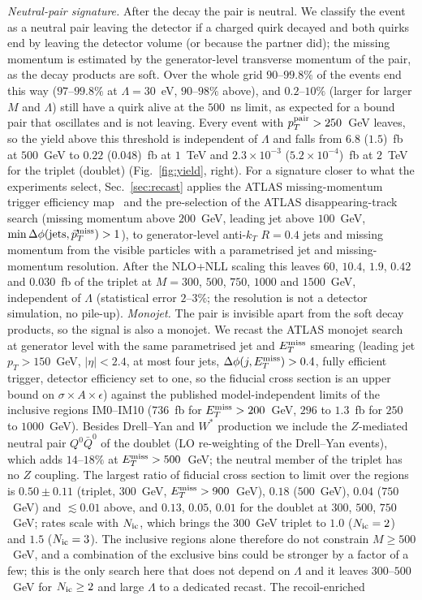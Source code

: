 \documentclass[prd,twocolumn,nofootinbib,superscriptaddress,amsmath,amssymb]{revtex4-2}
\begin{document}
\emph{Neutral-pair signature.} After the decay the pair is neutral. We classify the event as a neutral pair leaving the detector if a charged quirk decayed and both quirks end by leaving the detector volume (or because the partner did); the missing momentum is estimated by the generator-level transverse momentum of the pair, as the decay products are soft. Over the whole grid $90$--$99.8\%$ of the events end this way ($97$--$99.8\%$ at $\Lambda=30$~eV, $90$--$98\%$ above), and $0.2$--$10\%$ (larger for larger $M$ and $\Lambda$) still have a quirk alive at the $500$~ns limit, as expected for a bound pair that oscillates and is not leaving. Every event with $p_T^{\rm pair}>250$~GeV leaves, so the yield above this threshold is independent of $\Lambda$ and falls from $6.8$ ($1.5$)~fb at $500$~GeV to $0.22$ ($0.048$)~fb at $1$~TeV and $2.3\times10^{-3}$ ($5.2\times10^{-4}$)~fb at $2$~TeV for the triplet (doublet) (Fig.~\ref{fig:yield}, right). For a signature closer to what the experiments select, Sec.~\ref{sec:recast} applies the ATLAS missing-momentum trigger efficiency map~\cite{ATLAS:DT,RecastingCodes} and the pre-selection of the ATLAS disappearing-track search (missing momentum above $200$~GeV, leading jet above $100$~GeV, $\min\Delta\phi(\text{jets},\vec p_T^{\rm miss})>1$), to generator-level anti-$k_T$ $R=0.4$ jets and missing momentum from the visible particles with a parametrised jet and missing-momentum resolution. After the NLO+NLL scaling this leaves $60$, $10.4$, $1.9$, $0.42$ and $0.030$~fb of the triplet at $M=300$, $500$, $750$, $1000$ and $1500$~GeV, independent of $\Lambda$ (statistical error $2$--$3\%$; the resolution is not a detector simulation, no pile-up). \emph{Monojet.} The pair is invisible apart from the soft decay products, so the signal is also a monojet. We recast the ATLAS monojet search~\cite{ATLAS:monojet} at generator level with the same parametrised jet and $E_T^{\rm miss}$ smearing (leading jet $p_T>150$~GeV, $|\eta|<2.4$, at most four jets, $\Delta\phi(j,E_T^{\rm miss})>0.4$, fully efficient trigger, detector efficiency set to one, so the fiducial cross section is an upper bound on $\sigma\times A\times\epsilon$) against the published model-independent limits of the inclusive regions IM0--IM10 ($736$~fb for $E_T^{\rm miss}>200$~GeV, $296$ to $1.3$~fb for $250$ to $1000$~GeV). Besides Drell--Yan and $W^*$ production we include the $Z$-mediated neutral pair $Q^0\bar Q^0$ of the doublet (LO re-weighting of the Drell--Yan events), which adds $14$--$18\%$ at $E_T^{\rm miss}>500$~GeV; the neutral member of the triplet has no $Z$ coupling. The largest ratio of fiducial cross section to limit over the regions is $0.50\pm0.11$ (triplet, $300$~GeV, $E_T^{\rm miss}>900$~GeV), $0.18$ ($500$~GeV), $0.04$ ($750$~GeV) and $\lesssim0.01$ above, and $0.13$, $0.05$, $0.01$ for the doublet at $300$, $500$, $750$~GeV; rates scale with $N_{\rm ic}$, which brings the $300$~GeV triplet to $1.0$ ($N_{\rm ic}=2$) and $1.5$ ($N_{\rm ic}=3$). The inclusive regions alone therefore do not constrain $M\ge500$~GeV, and a combination of the exclusive bins could be stronger by a factor of a few; this is the only search here that does not depend on $\Lambda$ and it leaves $300$--$500$~GeV for $N_{\rm ic}\ge2$ and large $\Lambda$ to a dedicated recast. The recoil-enriched 
\end{document}
